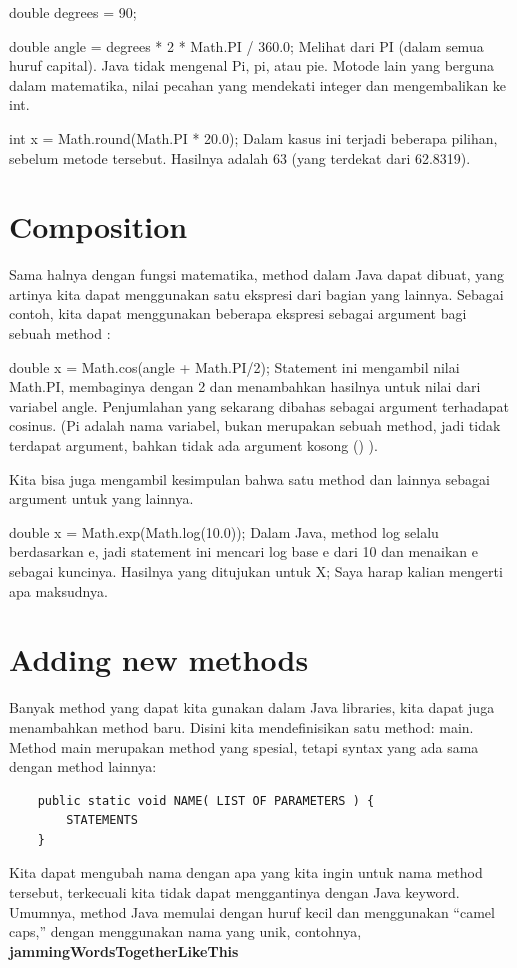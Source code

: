 	double degrees = 90;

	double angle = degrees * 2 * Math.PI / 360.0;\newline \newline
Melihat dari PI (dalam semua huruf capital). Java tidak mengenal Pi, pi, atau pie.\newline
Motode lain yang berguna dalam matematika, nilai pecahan yang mendekati integer dan mengembalikan ke int.\newline

	int x = Math.round(Math.PI * 20.0);\newline \newline
Dalam kasus ini terjadi beberapa pilihan, sebelum metode tersebut. Hasilnya adalah 63 (yang terdekat dari 62.8319).

\section{Composition}
Sama halnya dengan fungsi matematika, method dalam Java dapat dibuat, yang artinya kita dapat menggunakan satu ekspresi dari bagian yang lainnya. Sebagai contoh, kita dapat menggunakan beberapa ekspresi sebagai argument bagi sebuah method :\newline

	double x = Math.cos(angle + Math.PI/2);\newline \newline
Statement ini mengambil nilai Math.PI, membaginya dengan 2 dan menambahkan hasilnya untuk nilai dari variabel angle. Penjumlahan yang sekarang dibahas sebagai argument terhadapat cosinus. (Pi adalah nama variabel, bukan merupakan sebuah method, jadi tidak terdapat argument, bahkan tidak ada argument kosong () ).

Kita bisa juga mengambil kesimpulan bahwa satu method dan lainnya sebagai argument untuk yang lainnya.\newline

	double x = Math.exp(Math.log(10.0));\newline \newline
Dalam Java, method log selalu berdasarkan e, jadi statement ini mencari log base e dari 10 dan menaikan e sebagai kuncinya. Hasilnya yang ditujukan untuk X; Saya harap kalian mengerti apa maksudnya.

\section{Adding new methods}
Banyak method yang dapat kita gunakan dalam Java libraries, kita dapat juga menambahkan method baru. Disini kita mendefinisikan satu method: main. Method main merupakan method yang spesial, tetapi syntax yang ada sama dengan method lainnya:\newline
\begin{lstlisting}
	public static void NAME( LIST OF PARAMETERS ) {
		STATEMENTS
	}
\end{lstlisting}
Kita dapat mengubah nama dengan apa yang kita ingin untuk nama method tersebut, terkecuali kita tidak dapat menggantinya dengan Java keyword. Umumnya, method Java memulai dengan huruf kecil dan menggunakan “camel caps,” dengan menggunakan nama yang unik, contohnya, \textbf{jammingWordsTogetherLikeThis}

